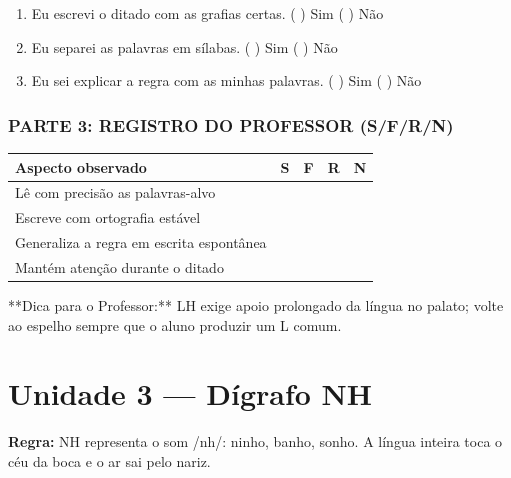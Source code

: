 \begin{exercicio}
\begin{enumerate}[label=\alph*)]
  \item Eu escrevi o ditado com as grafias certas.  \quad ( ) Sim   ( ) Não

  \item Eu separei as palavras em sílabas.  \quad ( ) Sim   ( ) Não

  \item Eu sei explicar a regra com as minhas palavras.  \quad ( ) Sim   ( ) Não

\end{enumerate}

\subsection*{PARTE 3: REGISTRO DO PROFESSOR (S/F/R/N)}

\begin{center}
\renewcommand{\arraystretch}{1.4}
\begin{tabular}{@{}p{9cm}cccc@{}}
\toprule
Aspecto observado & S & F & R & N \\
\midrule
Lê com precisão as palavras-alvo & & & & \\
Escreve com ortografia estável & & & & \\
Generaliza a regra em escrita espontânea & & & & \\
Mantém atenção durante o ditado & & & & \\
\bottomrule\end{tabular}\end{center}

\end{exercicio}

\begin{dica}
**Dica para o Professor:** LH exige apoio prolongado da língua no palato; volte ao espelho sempre que o aluno produzir um L comum.
\end{dica}


\chapter{Unidade 3 --- Dígrafo NH}


\textbf{Regra:} NH representa o som /nh/: ninho, banho, sonho. A língua inteira toca o céu da boca e o ar sai pelo nariz.

